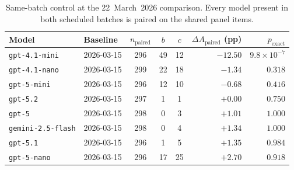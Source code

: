 \begin{table}[htbp]
    \centering
    \footnotesize
    \caption{Same-batch control at the 22~March~2026 comparison. Every model present in both
    scheduled batches is paired on the shared panel items.}
    \label{tab:control-same-week}
    \begin{tabular}{llcccrr}
    \toprule
    Model & Baseline & $n_{\mathrm{paired}}$ & $b$ & $c$ & $\Delta A_{\mathrm{paired}}$ (pp) & $p_{\mathrm{exact}}$ \\
    \midrule
    \texttt{gpt-4.1-mini} & 2026-03-15 & 296 & 49 & 12 & $-12.50$ & $9.8\times 10^{-7}$ \\
    \texttt{gpt-4.1-nano} & 2026-03-15 & 299 & 22 & 18 & $-1.34$ & $0.318$ \\
    \texttt{gpt-5-mini} & 2026-03-15 & 296 & 12 & 10 & $-0.68$ & $0.416$ \\
    \texttt{gpt-5.2} & 2026-03-15 & 297 & 1 & 1 & $+0.00$ & $0.750$ \\
    \texttt{gpt-5} & 2026-03-15 & 298 & 0 & 3 & $+1.01$ & $1.000$ \\
    \texttt{gemini-2.5-flash} & 2026-03-15 & 298 & 0 & 4 & $+1.34$ & $1.000$ \\
    \texttt{gpt-5.1} & 2026-03-15 & 296 & 1 & 5 & $+1.35$ & $0.984$ \\
    \texttt{gpt-5-nano} & 2026-03-15 & 296 & 17 & 25 & $+2.70$ & $0.918$ \\
    \bottomrule
    \end{tabular}
\end{table}
